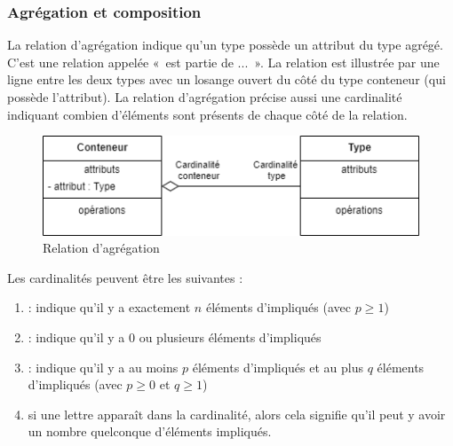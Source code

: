\subsubsection{Agrégation et composition}
La relation d'agrégation indique qu'un type possède un attribut du type agrégé. C'est une relation appelée «~est partie de ...~». La relation est illustrée par une ligne entre les deux types avec un losange ouvert du côté du type conteneur (qui possède l'attribut). La relation d'agrégation précise aussi une cardinalité indiquant combien d'éléments sont présents de chaque côté de la relation.

\begin{figure}[H]
	\caption{Relation d'agrégation}
	\centering
	\includegraphics[scale=0.4]{dcc-agregation.png}
\end{figure}

Les cardinalités peuvent être les suivantes :

\begin{enumerate}
	\item {} : indique qu'il y a exactement $n$ éléments d'impliqués (avec $p \geq 1$)
	\item \term{*} : indique qu'il y a 0 ou plusieurs éléments d'impliqués
	\item {} : indique qu'il y a au moins $p$ éléments d'impliqués et au plus $q$ éléments d'impliqués (avec $p \geq 0$ et $q \geq 1$)
	\item si une lettre apparaît dans la cardinalité, alors cela signifie qu'il peut y avoir un nombre quelconque d'éléments impliqués.
\end{enumerate}

